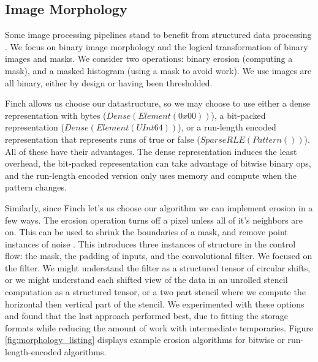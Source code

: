 \subsection{Image Morphology}

Some image processing pipelines stand to benefit from structured data processing \cite{donenfeld_unified_2022}.
%
We focus on binary image morphology and the logical transformation of binary images and masks.
%
We consider two operations: binary erosion (computing a mask), and a masked histogram (using a mask to avoid work).
%
We use images are all binary, either by design or having been thresholded.

Finch allows us choose our datastructure, so we may choose to use either a dense representation with bytes ($Dense(Element(0x00))$), a bit-packed representation ($Dense(Element(UInt64))$), or a run-length encoded representation that represents runs of true or false ($SparseRLE(Pattern())$).
%
All of these have their advantages.
%
The dense representation induces the least overhead, the bit-packed representation can take advantage of bitwise binary ops, and the run-length encoded version only uses memory and compute when the pattern changes. %

Similarly, since Finch let's us choose our algorithm we can implement erosion in a few ways.
%
The erosion operation turns off a pixel unless all of it's neighbors are on.
%
This can be used to shrink the boundaries of a mask, and remove point instances of noise \cite{fisher_hypermedia_1996}.
%
This introduces three instances of structure in the control flow: the mask, the padding of inputs, and the convolutional filter.
%
We focused on the filter.
%
We might understand the filter as a structured tensor of circular shifts, or we might understand each shifted view of the data in an unrolled stencil computation as a structured tensor, or a two part stencil where we compute the horizontal then vertical part of the stencil.
%
We experimented with these options and found that the last approach performed best, due to fitting the storage formats while reducing the amount of work with intermediate temporaries.
%
Figure \ref{fig:morphology_listing} displays example erosion algorithms for bitwise
or run-length-encoded algorithms.
%

